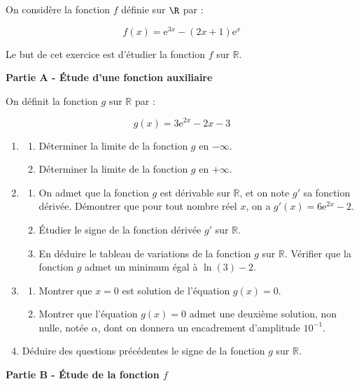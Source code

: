 \medskip

On considère la fonction $f$ définie sur $\R$ par :

\[f(x)=\mathrm{e}^{3 x}-(2 x+1) \mathrm{e}^{x}\]

Le but de cet exercice est d'étudier la fonction $f$ sur $\mathbb{R}$.

\medskip

\textbf{Partie A - Étude d'une fonction auxiliaire}

\medskip

On définit la fonction $g$ sur $\mathbb{R}$ par :

\[g(x)=3 \mathrm{e}^{2 x}- 2 x - 3\]

\begin{enumerate}
\item 
	\begin{enumerate}
		\item Déterminer la limite de la fonction $g$ en $-\infty$.
		\item Déterminer la limite de la fonction $g$ en $+\infty$.
	\end{enumerate}
\item 
	\begin{enumerate}
		\item On admet que la fonction $g$ est dérivable sur $\mathbb{R}$, et on note $g'$ sa fonction dérivée. Démontrer que pour tout nombre réel $x$, on a $g'(x)=6 \mathrm{e}^{2 x}-2$.
		\item Étudier le signe de la fonction dérivée $g'$ sur $\mathbb{R}$.
		\item En déduire le tableau de variations de la fonction $g$ sur $\mathbb{R}$. Vérifier que la fonction $g$ admet un minimum égal à $\ln (3) - 2$.
	\end{enumerate}
\item 
	\begin{enumerate}
		\item Montrer que $x=0$ est solution de l'équation $g(x) = 0$.
		\item Montrer que l'équation $g(x)=0$ admet une deuxième solution, non nulle, notée $\alpha$, dont on donnera un encadrement d'amplitude $10^{-1}$.
	\end{enumerate}
\item Déduire des questions précédentes le signe de la fonction $g$ sur $\mathbb{R}$.
	\end{enumerate}

\medskip

\textbf{Partie B - Étude de la fonction \boldmath$f$\unboldmath}


